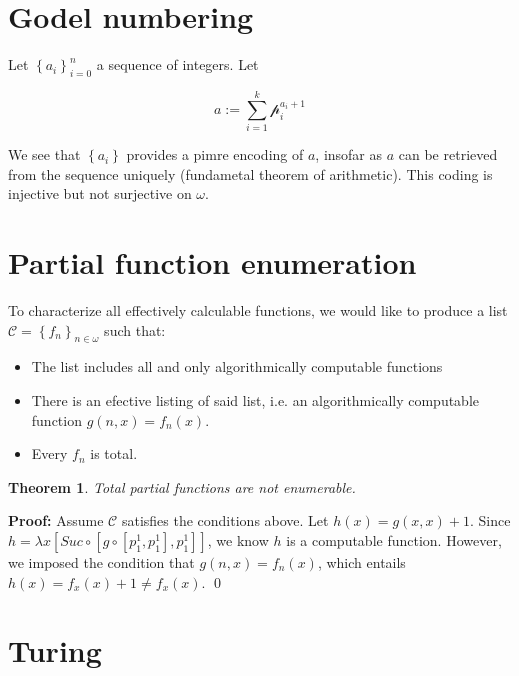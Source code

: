 \documentclass[a4paper, 12pt]{article}
\newtheorem{theorem}{Theorem}
\newtheorem{theorem}{Theorem}
\newenvironment{proof}[1][Proof]{\par\small\noindent\textbf{#1:} }{\qed\par\normalsize}
\begin{document}
\section{Godel numbering}

Let $\left\{ a_i \right\}_{i=0}^{n} $ a sequence of integers. Let 

\begin{equation*}
    a := \sum_{i=1}^{k} \mathcal{p}_i^{a_i + 1}
\end{equation*}

We see that $\left\{ a_i \right\} $ provides a pimre encoding of $a$,
insofar as $a$ can be retrieved from the sequence 
uniquely (fundametal theorem of arithmetic). This 
coding is injective but not surjective on $\omega$.

\section{Partial function enumeration}

To characterize all effectively calculable functions, we would 
like to produce a list $\mathcal{C} = \left\{ f_n \right\}_{n \in \omega} $
such that: 

\begin{itemize}
    \item The list includes all and only algorithmically computable functions 
    \item There is an efective listing of said list, i.e. an algorithmically
        computable function $g(n, x) = f_n(x)$. 
    \item Every $f_n$ is total.
\end{itemize}

\begin{theorem}
    Total partial functions are not enumerable.
\end{theorem}

\begin{proof}
    Assume $\mathcal{C}$ satisfies the conditions above. Let 
    $h(x) = g(x, x) + 1$. Since $h = \lambda x \left[ Suc \circ \left[ g \circ \left[ p_1^{1}, p_1^1 \right], p_1^1 \right]   \right] $, we know $h$ is a computable function. However, 
    we imposed the condition that $g(n, x) = f_n(x)$, which entails 
    $h(x) = f_x(x) + 1 \neq f_x(x)$.
\end{proof}


\section{Turing}
\end{document}

